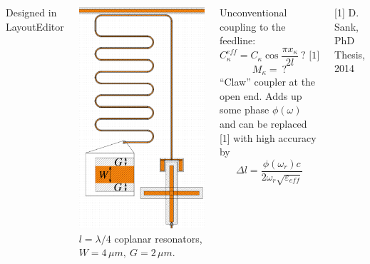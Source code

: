 \documentclass[aspectratio=169, 13pt, t]{beamer}
\begin{document}
\begin{frame}[c]\frametitle{\secname}\framesubtitle{\subsecname}
\begin{columns}[c]
{\footnotesize Designed in LayoutEditor}

\includegraphics[height=0.85\textheight]{xmonres}
$l = \lambda/4$ coplanar resonators, $W=4\,\mu m,\ G=2\,\mu m$.

\vspace{0.5cm}
Unconventional coupling to the feedline:
 $$C_\kappa^{eff} = C_\kappa \cos \frac{\pi x_\kappa}{2 l}\ ? \text{ [1]}$$
 $$M_\kappa =\ ?$$
``Claw'' coupler at the open end. Adds up some phase $\phi(\omega)$ and can be replaced [1] with high accuracy by
$$\Delta l = \frac{\phi(\omega_r) c}{2 \omega_r \sqrt{\varepsilon_{eff}}}$$


{\footnotesize[1] D. Sank, PhD Thesis, 2014}
\end{columns}
\end{frame}
\end{document}
